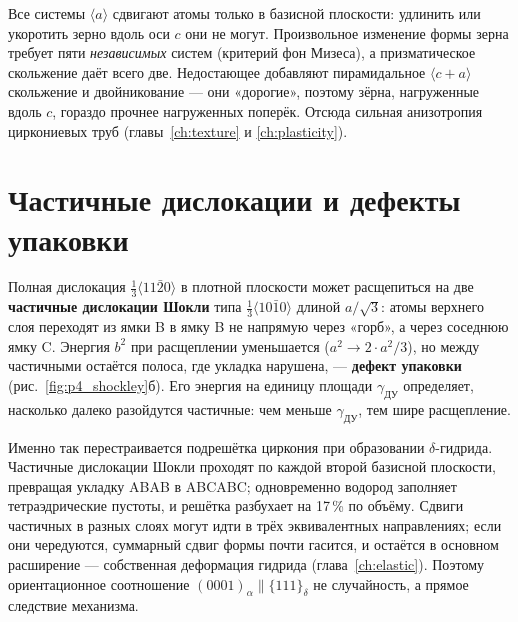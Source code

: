 Все системы $\langle a\rangle$ сдвигают атомы только в базисной плоскости: удлинить или укоротить зерно вдоль
оси $c$ они не могут. Произвольное изменение формы зерна требует пяти \emph{независимых} систем (критерий фон
Мизеса), а призматическое скольжение даёт всего две. Недостающее добавляют пирамидальное $\langle c+a\rangle$
скольжение и двойникование --- они «дорогие», поэтому зёрна, нагруженные вдоль $c$, гораздо прочнее нагруженных
поперёк. Отсюда сильная анизотропия циркониевых труб (главы~\ref{ch:texture} и \ref{ch:plasticity}).

\section{Частичные дислокации и дефекты упаковки}

Полная дислокация $\tfrac13\langle11\bar20\rangle$ в плотной плоскости может расщепиться на две
\textbf{частичные дислокации Шокли} типа $\tfrac13\langle10\bar10\rangle$ длиной $a/\sqrt3$: атомы верхнего слоя
переходят из ямки B в ямку B не напрямую через «горб», а через соседнюю ямку C. Энергия $b^2$ при расщеплении
уменьшается ($a^2 \to 2\cdot a^2/3$), но между частичными остаётся полоса, где укладка нарушена, ---
\textbf{дефект упаковки} (рис.~\ref{fig:p4_shockley}б). Его энергия на единицу площади $\gamma_{\text{ДУ}}$
определяет, насколько далеко разойдутся частичные: чем меньше $\gamma_{\text{ДУ}}$, тем шире расщепление.


\begin{zrbox}
Именно так перестраивается подрешётка циркония при образовании $\delta$-гидрида. Частичные дислокации Шокли
проходят по каждой второй базисной плоскости, превращая укладку ABAB в ABCABC; одновременно водород заполняет
тетраэдрические пустоты, и решётка разбухает на 17\,\% по объёму. Сдвиги частичных в разных слоях могут идти в
трёх эквивалентных направлениях; если они чередуются, суммарный сдвиг формы почти гасится, и остаётся в
основном расширение --- собственная деформация гидрида (глава~\ref{ch:elastic}). Поэтому ориентационное
соотношение $(0001)_\alpha\parallel\{111\}_\delta$ не случайность, а прямое следствие механизма.
\end{zrbox}


